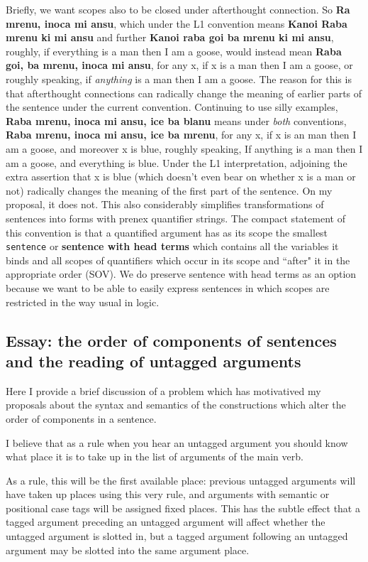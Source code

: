 \documentclass[12pt]{book}
\begin{document}
{Briefly, we want scopes also to be closed under afterthought connection.  So {\bf Ra mrenu, inoca mi ansu}, which under the L1 convention means {\bf Kanoi Raba mrenu ki mi ansu} and further {\bf Kanoi raba goi ba mrenu ki mi ansu}, roughly, if everything is a man then I am a goose, would instead mean {\bf Raba goi, ba mrenu, inoca mi ansu}, for any x, if x is a man then I am a goose, or roughly speaking, if {\em anything} is a man then I am a goose.  The reason for this is that afterthought connections can radically change the meaning of earlier parts of the sentence under the current convention.  Continuing to use silly examples, {\bf Raba mrenu, inoca mi ansu, ice ba blanu} means under {\em both} conventions,
{\bf Raba mrenu, inoca mi ansu, ice ba mrenu}, for any x, if x is an man then I am a goose, and moreover x is blue, roughly speaking, If anything is a man then I am a goose, and everything is blue.  Under the L1 interpretation, adjoining the extra assertion that x is blue (which doesn't even bear on whether x is a man or not) radically changes the meaning of the first part of the sentence.  On my proposal, it does not.  This also considerably simplifies transformations of sentences into forms with prenex quantifier strings.  The compact statement of this convention is that a quantified argument has as its scope the smallest {\tt sentence} or {\bf sentence with head terms} which contains all the variables it binds and all scopes of quantifiers which occur in its scope and ``after" it in the appropriate order (SOV).  We do preserve sentence with head terms as an option because we want to be able to easily express sentences in which scopes are restricted in the way usual in logic.

\subsection{Essay:  the order of components of sentences and the reading of untagged arguments}

Here I provide a brief discussion of a problem which has motivatived my proposals about the syntax and semantics
of the constructions which alter the order of components in a sentence.

I believe that as a rule when you hear an untagged argument you should know what place it is to take up in the list of arguments of the main verb.

As a rule, this will be the first available place:  previous untagged arguments will have taken up places using this very rule, and arguments with semantic or positional case tags will be assigned fixed places.  This has the subtle effect that
a tagged argument preceding an untagged argument will affect whether the untagged argument is slotted in, but a tagged argument following an untagged argument may be slotted into the same argument place.

}
\end{document}
